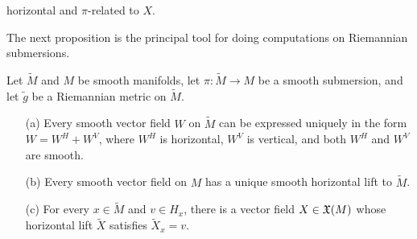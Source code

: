 horizontal and $\pi$-related to $X$.\par
The next proposition is the principal tool for doing computations on Riemannian 
submersions.
\begin{proposition}\label{Riemann horizontal vector field}
Let $\widetilde{M}$ and $M$ be smooth manifolds, let $\pi:\widetilde{M}\to M$ be a 
smooth submersion, and let $\widetilde{g}$ be a Riemannian metric on $\widetilde{M}$.
\begin{itemize}
\item[(a)] Every smooth vector field $W$ on $\widetilde{M}$ can be expressed 
uniquely in the form $W=W^H+W^V$, where $W^H$ is horizontal, $W^V$ is vertical, 
and both $W^H$ and $W^V$ are smooth.
\item[(b)] Every smooth vector field on $M$ has a unique smooth horizontal lift 
to $\widetilde{M}$.
\item[(c)] For every $x\in\widetilde{M}$ and $v\in H_x$, there is a vector field $X\in\mathfrak{X}(M)$ 
whose horizontal lift $\widetilde{X}$ satisfies $\widetilde{X}_x=v$.
\end{itemize}
\end{proposition}
